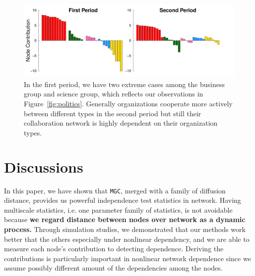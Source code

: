 \documentclass[12pt]{article}
\theoremstyle{definition}
\begin{document}
\begin{figure}[h]
	\centering
	\includegraphics[width=\linewidth]{../../Figure/barplots_nolegend.pdf}	
	\caption{In the first period, we have two extreme cases among the business group and science group, which reflects our observations in Figure~\ref{fig:politics}. Generally organizations cooperate more actively between different types in the second period but still their collaboration network is highly dependent on their organization types.}
	\label{fig:barplots}
\end{figure}

\section{Discussions}
\label{sec:discussion}
	
In this paper, we have shown that \texttt{MGC}, merged with a family of diffusion distance, provides us powerful independence test statistics in network. Having multiscale statistics, i.e. one parameter family of statistics, is not avoidable because \textbf{we regard distance between nodes over network as a dynamic process.} Through simulation studies, we demonstrated that our methods work better that the others especially under nonlinear dependency, and we are able to measure each node's contribution to detecting dependence. Deriving the contributions is particularly important in nonlinear network dependence since we assume possibly different amount of the dependencies among the nodes.  
\end{document}
